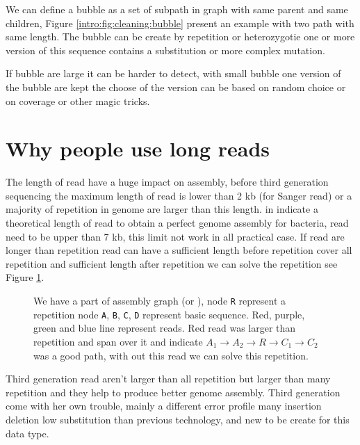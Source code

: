 \documentclass[./main.tex]{subfiles}
\begin{document}
We can define a bubble as a set of subpath in graph with same parent and same children, Figure \ref{intro:fig:cleaning:bubble} present an example with two path with same length. The bubble can be create by repetition or heterozygotie one or more version of this sequence contains a substitution or more complex mutation.

If bubble are large it can be harder to detect, with small bubble one version of the bubble are kept the choose of the version can be based on random choice or on coverage or other magic tricks.

\section{Why people use long reads}


The length of read have a huge impact on assembly, before third generation sequencing the maximum length of read is lower than 2 kb (for Sanger read) or a majority of repetition in genome are larger than this length. \citeauthor{one_chromosome_one_contig} in \cite{one_chromosome_one_contig} indicate a theoretical length of read to obtain a perfect genome assembly for bacteria, read need to be upper than 7 kb, this limit not work in all practical case. If read are longer than repetition read can have a sufficient length before repetition cover all repetition and sufficient length after repetition we can solve the repetition see Figure \ref{intro:fig:whylongreads}.

\begin{figure}[ht]
    \centering
    
    \caption{We have a part of assembly graph (\OLC or \DBG), node \texttt{R} represent a repetition node \texttt{A}, \texttt{B}, \texttt{C}, \texttt{D} represent basic sequence. Red, purple, green and blue line represent reads. Red read was larger than repetition and span over it and indicate $A_1 \rightarrow A_2 \rightarrow R \rightarrow C_1 \rightarrow C_2$ was a good path, with out this read we can solve this repetition.}
    \label{intro:fig:whylongreads}
\end{figure}

Third generation read aren't larger than all repetition but larger than many repetition and they help to produce better genome assembly.
Third generation come with her own trouble, mainly a different error profile many insertion deletion low substitution than previous technology, and new to be create for this data type.
\end{document}
